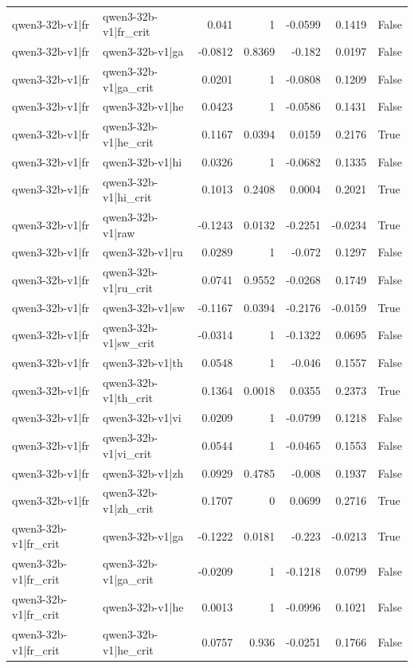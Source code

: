 \begin{table}
\begin{tabular}{l l r r r r l}
qwen3-32b-v1|fr & qwen3-32b-v1|fr_crit & 0.041 & 1 & -0.0599 & 0.1419 & False \\
qwen3-32b-v1|fr & qwen3-32b-v1|ga & -0.0812 & 0.8369 & -0.182 & 0.0197 & False \\
qwen3-32b-v1|fr & qwen3-32b-v1|ga_crit & 0.0201 & 1 & -0.0808 & 0.1209 & False \\
qwen3-32b-v1|fr & qwen3-32b-v1|he & 0.0423 & 1 & -0.0586 & 0.1431 & False \\
qwen3-32b-v1|fr & qwen3-32b-v1|he_crit & 0.1167 & 0.0394 & 0.0159 & 0.2176 & True \\
qwen3-32b-v1|fr & qwen3-32b-v1|hi & 0.0326 & 1 & -0.0682 & 0.1335 & False \\
qwen3-32b-v1|fr & qwen3-32b-v1|hi_crit & 0.1013 & 0.2408 & 0.0004 & 0.2021 & True \\
qwen3-32b-v1|fr & qwen3-32b-v1|raw & -0.1243 & 0.0132 & -0.2251 & -0.0234 & True \\
qwen3-32b-v1|fr & qwen3-32b-v1|ru & 0.0289 & 1 & -0.072 & 0.1297 & False \\
qwen3-32b-v1|fr & qwen3-32b-v1|ru_crit & 0.0741 & 0.9552 & -0.0268 & 0.1749 & False \\
qwen3-32b-v1|fr & qwen3-32b-v1|sw & -0.1167 & 0.0394 & -0.2176 & -0.0159 & True \\
qwen3-32b-v1|fr & qwen3-32b-v1|sw_crit & -0.0314 & 1 & -0.1322 & 0.0695 & False \\
qwen3-32b-v1|fr & qwen3-32b-v1|th & 0.0548 & 1 & -0.046 & 0.1557 & False \\
qwen3-32b-v1|fr & qwen3-32b-v1|th_crit & 0.1364 & 0.0018 & 0.0355 & 0.2373 & True \\
qwen3-32b-v1|fr & qwen3-32b-v1|vi & 0.0209 & 1 & -0.0799 & 0.1218 & False \\
qwen3-32b-v1|fr & qwen3-32b-v1|vi_crit & 0.0544 & 1 & -0.0465 & 0.1553 & False \\
qwen3-32b-v1|fr & qwen3-32b-v1|zh & 0.0929 & 0.4785 & -0.008 & 0.1937 & False \\
qwen3-32b-v1|fr & qwen3-32b-v1|zh_crit & 0.1707 & 0 & 0.0699 & 0.2716 & True \\
qwen3-32b-v1|fr_crit & qwen3-32b-v1|ga & -0.1222 & 0.0181 & -0.223 & -0.0213 & True \\
qwen3-32b-v1|fr_crit & qwen3-32b-v1|ga_crit & -0.0209 & 1 & -0.1218 & 0.0799 & False \\
qwen3-32b-v1|fr_crit & qwen3-32b-v1|he & 0.0013 & 1 & -0.0996 & 0.1021 & False \\
qwen3-32b-v1|fr_crit & qwen3-32b-v1|he_crit & 0.0757 & 0.936 & -0.0251 & 0.1766 & False \\

\end{tabular}
\end{table}
